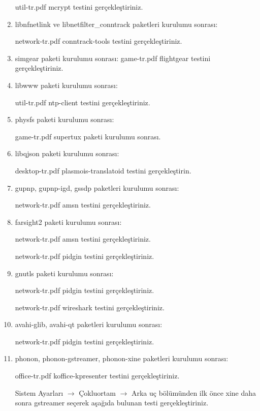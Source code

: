 \documentclass[a4paper,10pt]{article}
\begin{document}
\begin{enumerate}
util-tr.pdf mcrypt testini gerçekleştiriniz.

\item libnfnetlink ve libnetfilter\_conntrack paketleri kurulumu sonrası:

network-tr.pdf conntrack-tools testini gerçekleştiriniz.

\item simgear paketi kurulumu sonrası:
game-tr.pdf flightgear testini gerçekleştiriniz.

\item libwww paketi kurulumu sonrası:

util-tr.pdf ntp-client testini gerçekleştiriniz.

\item physfs paketi kurulumu sonrası:

game-tr.pdf supertux paketi kurulumu sonrası.

\item libqjson paketi kurulumu sonrası:

desktop-tr.pdf plasmois-translatoid testini gerçekleştirin.

\item gupnp, gupnp-igd, gssdp paketleri kurulumu sonrası:

network-tr.pdf amsn testini gerçekleştiriniz.

\item farsight2 paketi kurulumu sonrası:

network-tr.pdf amsn testini gerçekleştiriniz.

network-tr.pdf pidgin testini gerçekleştiriniz.

\item gnutls paketi kurulumu sonrası:

network-tr.pdf pidgin testini gerçekleştiriniz.

network-tr.pdf wireshark testini gerçekleştiriniz.

\item avahi-glib, avahi-qt paketleri kurulumu sonrası:

network-tr.pdf pidgin testini gerçekleştiriniz.

\item phonon, phonon-gstreamer, phonon-xine paketleri kurulumu sonrası:

office-tr.pdf koffice-kpresenter testini gerçekleştiriniz.

Sistem Ayarları $\rightarrow$ Çokluortam $\rightarrow$ Arka uç bölümünden ilk önce xine daha sonra gstreamer seçerek aşağıda bulunan testi gerçekleştiriniz.


\end{enumerate}
\end{document}
